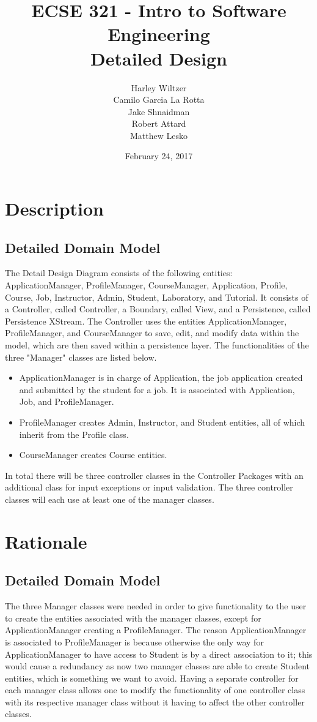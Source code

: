 \documentclass[12pt]{article}
\title{ECSE 321 - Intro to Software Engineering\\Detailed Design}
\author{Harley Wiltzer\\Camilo Garcia La Rotta\\Jake Shnaidman\\Robert Attard\\Matthew Lesko}
\date{February 24, 2017}
\begin{document}
\maketitle
\newpage
{} %
\tableofcontents
\section{Description}
\subsection{Detailed Domain Model}
The Detail Design Diagram consists of the following entities: ApplicationManager, ProfileManager, CourseManager, Application, Profile, Course, Job, Instructor, Admin, Student, Laboratory, and Tutorial. It consists of a Controller, called Controller, a Boundary, called View, and a Persistence, called Persistence XStream. The Controller uses the entities ApplicationManager, ProfileManager, and CourseManager to save, edit, and modify data within the model, which are then saved within a persistence layer. The functionalities of the three "Manager" classes are listed below.
\begin{itemize}
	\item ApplicationManager is in charge of Application, the job application created and submitted by the student for a job. It is associated with Application, Job, and ProfileManager.
	\item ProfileManager creates Admin, Instructor, and Student entities, all of which inherit from the Profile class.
	\item CourseManager creates Course entities.
\end{itemize}
In total there will be three controller classes in the Controller Packages with an additional class for input exceptions or input validation. The three controller classes will each use at least one of the manager classes.
\section{Rationale}
\subsection{Detailed Domain Model}
The three Manager classes were needed in order to give functionality to the user to create the entities associated with the manager classes, except for ApplicationManager creating a ProfileManager. The reason ApplicationManager is associated to ProfileManager is because otherwise the only way for ApplicationManager to have access to Student is by a direct association to it; this would cause a redundancy as now two manager classes are able to create Student entities, which is something we want to avoid. Having a separate controller for each manager class allows one to modify the functionality of one controller class with its respective manager class without it having to affect the other controller classes.
\end{document}
